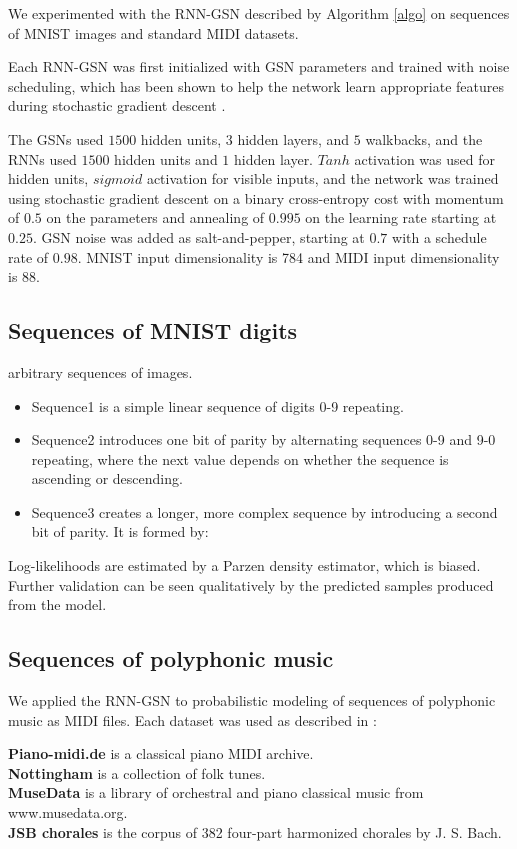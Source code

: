We experimented with the RNN-GSN described by Algorithm \ref{algo} on sequences of MNIST images and standard MIDI datasets.

Each RNN-GSN was first initialized with GSN parameters and trained with noise scheduling, which has been shown to help the network learn appropriate features during stochastic gradient descent \cite{noise_schedule}.

The GSNs used $1500$ hidden units, $3$ hidden layers, and $5$ walkbacks, and the RNNs used $1500$ hidden units and $1$ hidden layer. $Tanh$ activation was used for hidden units, $sigmoid$ activation for visible inputs, and the network was trained using stochastic gradient descent on a binary cross-entropy cost with momentum of $0.5$ on the parameters and annealing of $0.995$ on the learning rate starting at $0.25$. GSN noise was added as salt-and-pepper, starting at $0.7$ with a schedule rate of $0.98$. MNIST input dimensionality is 784 and MIDI input dimensionality is 88.
\subsection{Sequences of MNIST digits}
	arbitrary sequences of images.
	\begin{itemize}
		\item Sequence1 is a simple linear sequence of digits 0-9 repeating.
		\item Sequence2 introduces one bit of parity by alternating sequences 0-9 and 9-0 repeating, where the next value depends on whether the sequence is ascending or descending.
		\item Sequence3 creates a longer, more complex sequence by introducing a second bit of parity. It is formed by:
	\end{itemize}
	
Log-likelihoods are estimated by a Parzen density estimator, which is biased. Further validation can be seen qualitatively by the predicted samples produced from the model.

\subsection{Sequences of polyphonic music}
	We applied the RNN-GSN to probabilistic modeling of sequences of polyphonic music as MIDI files. Each dataset was used as described in \cite{rnnrbm}:

\textbf{Piano-midi.de} is a classical piano MIDI archive.\\
\textbf{Nottingham} is a collection of folk tunes.\\
\textbf{MuseData} is a library of orchestral and piano classical music from www.musedata.org.\\
\textbf{JSB chorales} is the corpus of 382 four-part harmonized chorales by J. S. Bach.
	
